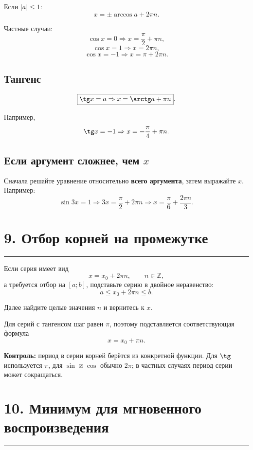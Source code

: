 \documentclass[a4paper,12pt]{article}
\newcommand{\sectionline}{\vspace{-1mm}\noindent\color{accent}\rule{\linewidth}{0.7pt}\color{textgray}\vspace{2mm}}
\newcommand{\key}[1]{\textbf{\color{darkaccent}#1}}
\newcommand{\Z}{\mathbb{Z}}
\begin{document}
Если $|a|\le1$:
\[
\boxed{x=\pm\arccos a+2\pi n}.
\]

Частные случаи:
\[
\boxed{\cos x=0\Rightarrow x=\frac\pi2+\pi n},
\]
\[
\boxed{\cos x=1\Rightarrow x=2\pi n},
\]
\[
\boxed{\cos x=-1\Rightarrow x=\pi+2\pi n}.
\]

\subsection*{Тангенс}
\[
\boxed{\tg x=a\Rightarrow x=\arctg a+\pi n}.
\]

Например,
\[
\tg x=-1\Rightarrow x=-\frac\pi4+\pi n.
\]

\subsection*{Если аргумент сложнее, чем $x$}

Сначала решайте уравнение относительно \key{всего аргумента}, затем выражайте $x$. Например:
\[
\sin3x=1
\Rightarrow
3x=\frac\pi2+2\pi n
\Rightarrow
\boxed{x=\frac\pi6+\frac{2\pi n}{3}}.
\]

\section*{9. Отбор корней на промежутке}
\sectionline
\enlargethispage{3\baselineskip}

Если серия имеет вид
\[
x=x_0+2\pi n,
\qquad n\in\Z,
\]
а требуется отбор на $[a;b]$, подставьте серию в двойное неравенство:
\[
\boxed{a\le x_0+2\pi n\le b}.
\]

Далее найдите целые значения $n$ и вернитесь к $x$.

Для серий с тангенсом шаг равен $\pi$, поэтому подставляется соответствующая формула
\[
x=x_0+\pi n.
\]

\key{Контроль:} период в серии корней берётся из конкретной функции. Для $\tg$ используется $\pi$, для $\sin$ и $\cos$ обычно $2\pi$; в частных случаях период серии может сокращаться.

\clearpage
\section*{10. Минимум для мгновенного воспроизведения}
\sectionline
\end{document}
